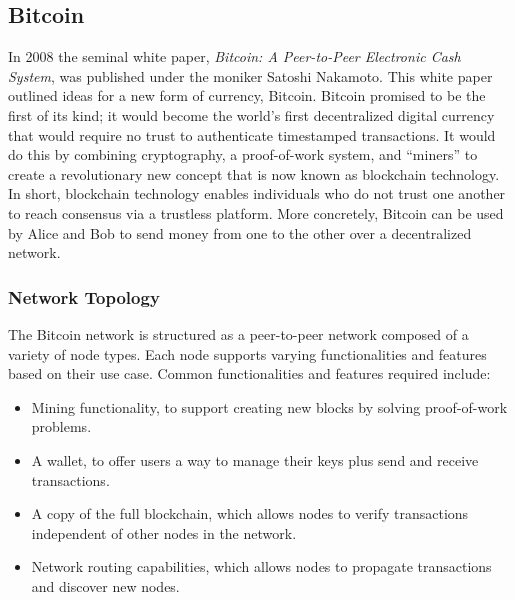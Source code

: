 \subsection{Bitcoin}
In 2008 the seminal white paper, \emph{Bitcoin: A Peer-to-Peer Electronic Cash
System}, was published under the moniker Satoshi Nakamoto.\cite{bitcoin} This
white paper outlined ideas for a new form of currency, Bitcoin. Bitcoin promised
to be the first of its kind; it would become the world's first decentralized
digital currency that would require no trust to authenticate timestamped
transactions. It would do this by combining cryptography, a proof-of-work
system, and ``miners'' to create a revolutionary new concept that is now known
as blockchain technology. In short, blockchain technology enables individuals
who do not trust one another to reach consensus via a trustless platform. More
concretely, Bitcoin can be used by Alice and Bob to send money from one to the
other over a decentralized network.

\subsubsection{Network Topology}
The Bitcoin network is structured as a peer-to-peer network composed of a
variety of node types. Each node supports varying functionalities and features
based on their use case. Common functionalities and features required
include:\cite{mastering-bitcoin}
\begin{itemize}
    \item Mining functionality, to support creating new blocks by solving
      proof-of-work problems.
    \item A wallet, to offer users a way to manage their keys plus send and
      receive transactions.
    \item A copy of the full blockchain, which allows nodes to verify
      transactions independent of other nodes in the network.
    \item Network routing capabilities, which allows nodes to propagate
      transactions and discover new nodes.
\end{itemize}

